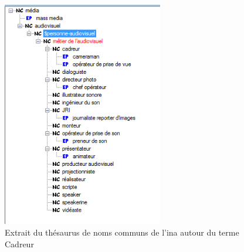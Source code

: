\begin{figure}[!h]
	\centering
	\includegraphics[width=7cm]{images/cadreur_hierarchie.png}
	\medskip
	\caption[Extrait du thésaurus de noms communs de l'\ac{ina}]{Extrait du thésaurus de noms communs de l'\ac{ina} autour du terme \og Cadreur\fg{}}
\end{figure}